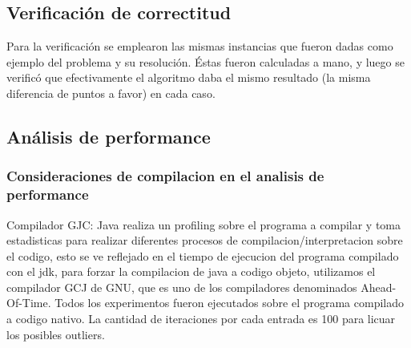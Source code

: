 \subsection{Verificaci\'on de correctitud}
Para la verificaci\'on se emplearon las mismas instancias que fueron dadas como ejemplo del problema y su resoluci\'on. \'Estas fueron calculadas a mano, y luego se verific\'o que efectivamente el algoritmo daba el mismo resultado (la misma diferencia de puntos a favor) en cada caso.


\subsection{An\'alisis de performance}
\subsubsection{Consideraciones de compilacion en el analisis de performance}
Compilador GJC: Java realiza un profiling sobre el programa a compilar y toma estadisticas para realizar diferentes procesos de compilacion/interpretacion sobre el codigo, esto se ve reflejado en el tiempo de ejecucion del programa compilado con el jdk, para forzar la compilacion de java a codigo objeto, utilizamos el compilador GCJ de GNU, que es uno de los compiladores denominados Ahead-Of-Time. Todos los experimentos fueron ejecutados sobre el programa compilado a codigo nativo. La cantidad de iteraciones por cada entrada es 100 para licuar los posibles outliers.

